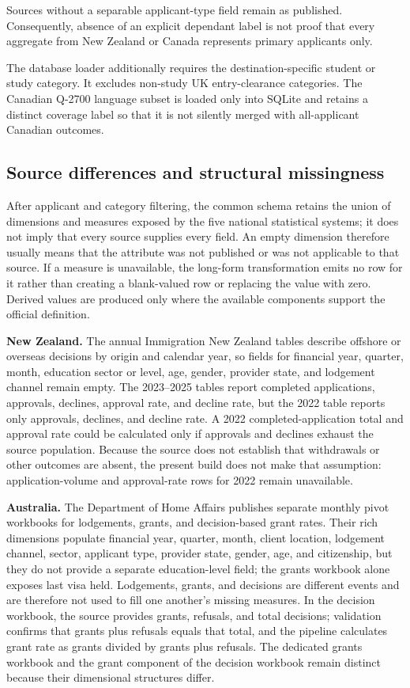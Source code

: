 \documentclass[runningheads]{llncs}
\begin{document}
Sources without a separable applicant-type field remain as published. Consequently, absence of an explicit dependant label is not proof that every aggregate from New Zealand or Canada represents primary applicants only.

The database loader additionally requires the destination-specific student or study category. It excludes non-study UK entry-clearance categories. The Canadian Q-2700 language subset is loaded only into SQLite and retains a distinct coverage label so that it is not silently merged with all-applicant Canadian outcomes.

\subsection{Source differences and structural missingness}

After applicant and category filtering, the common schema retains the union of dimensions and measures exposed by the five national statistical systems; it does not imply that every source supplies every field. An empty dimension therefore usually means that the attribute was not published or was not applicable to that source. If a measure is unavailable, the long-form transformation emits no row for it rather than creating a blank-valued row or replacing the value with zero. Derived values are produced only where the available components support the official definition.

\textbf{New Zealand.} The annual Immigration New Zealand tables describe offshore or overseas decisions by origin and calendar year, so fields for financial year, quarter, month, education sector or level, age, gender, provider state, and lodgement channel remain empty. The 2023--2025 tables report completed applications, approvals, declines, approval rate, and decline rate, but the 2022 table reports only approvals, declines, and decline rate. A 2022 completed-application total and approval rate could be calculated only if approvals and declines exhaust the source population. Because the source does not establish that withdrawals or other outcomes are absent, the present build does not make that assumption: application-volume and approval-rate rows for 2022 remain unavailable.

\textbf{Australia.} The Department of Home Affairs publishes separate monthly pivot workbooks for lodgements, grants, and decision-based grant rates. Their rich dimensions populate financial year, quarter, month, client location, lodgement channel, sector, applicant type, provider state, gender, age, and citizenship, but they do not provide a separate education-level field; the grants workbook alone exposes last visa held. Lodgements, grants, and decisions are different events and are therefore not used to fill one another's missing measures. In the decision workbook, the source provides grants, refusals, and total decisions; validation confirms that grants plus refusals equals that total, and the pipeline calculates grant rate as grants divided by grants plus refusals. The dedicated grants workbook and the grant component of the decision workbook remain distinct because their dimensional structures differ.
\end{document}
